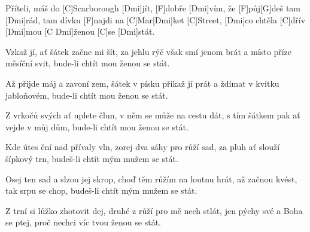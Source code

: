 
\sloka
[Dmi]Příteli, máš do [C]Scarborough [Dmi]jít,
[F]dobře [Dmi]vím, že [F]půj[G]deš tam [Dmi]rád,
tam dívku [F]najdi na [C]Mar[Dmi]ket [C]Street,
[Dmi]co chtěla [C]dřív [Dmi]mou [C Dmi]ženou [C]se [Dmi]stát.

\sloka
Vzkaž jí, ať šátek začne mi šít,
za jehlu rýč však smí jenom brát
a místo příze měsíční svit,
bude-li chtít mou ženou se stát.

\sloka
Až přijde máj a zavoní zem,
šátek v písku přikaž jí prát
a ždímat v kvítku jabloňovém,
bude-li chtít mou ženou se stát.

\sloka
Z vrkočů svých ať uplete člun,
v něm se může na cestu dát,
s tím šátkem pak ať vejde v můj dům,
bude-li chtít mou ženou se stát.

\sloka
Kde útes ční nad přívaly vln,
zorej dva sáhy pro růží sad,
za pluh ať slouží šípkový trn,
budeš-li chtít mým mužem se stát.

\sloka
Osej ten sad a slzou jej skrop,
choď těm růžím na loutnu hrát,
až začnou kvést, tak srpu se chop,
budeš-li chtít mým mužem se stát.

\sloka
Z trní si lůžko zhotovit dej,
druhé z růží pro mě nech stlát,
jen pýchy své a Boha se ptej,
proč nechci víc tvou ženou se stát.
